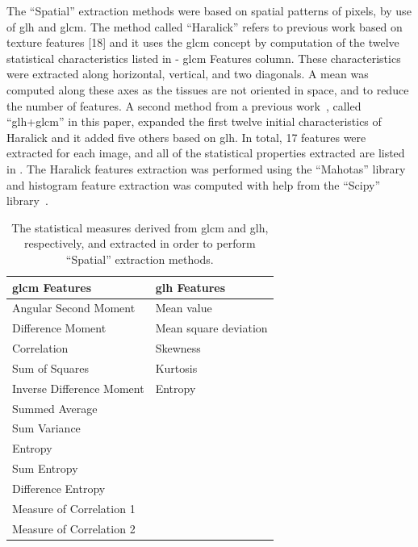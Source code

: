 \documentclass[journal,article,submit,moreauthors,pdftex, applsci]{Definitions/mdpi}
\begin{document}
The “Spatial” extraction methods were based on spatial patterns of pixels, by use of \ac{glh} and \ac{glcm}. The method called “Haralick” refers to previous work based on texture features [18] and it uses the \ac{glcm} concept by computation of the twelve statistical characteristics listed in  - \ac{glcm} Features column. These characteristics were extracted along horizontal, vertical, and two diagonals. A mean was computed along these axes as the tissues are not oriented in space, and to reduce the number of features. A second method from a previous work~\cite{Wiltgen2008}, called “\ac{glh}+\ac{glcm}” in this paper, expanded the first twelve initial characteristics of Haralick and it added five others based on \ac{glh}. In total, 17 features were extracted for each image, and all of the statistical properties extracted are listed in . The Haralick features extraction was performed using the “Mahotas” library~\cite{coelho2012mahotas} and histogram feature extraction was computed with help from the “Scipy” library~\cite{Jones2001}.\par
\begin{table}[h]
    \centering
    \begin{tabular}{ll}
        \hline
        \textbf{\ac{glcm} Features}& \textbf{\ac{glh} Features}     \\ \hline
        Angular Second Moment      & Mean value                     \\
        Difference Moment          & Mean square deviation          \\
        Correlation                & Skewness                       \\
        Sum of Squares             & Kurtosis                       \\
        Inverse Difference Moment  & Entropy                        \\     
        Summed Average             &                                \\    
        Sum Variance               &                                \\    
        Entropy                    &                                \\    
        Sum Entropy                &                                \\    
        Difference Entropy         &                                \\    
        Measure of Correlation 1   &                                \\  
        Measure of Correlation 2   &                                \\ 
    \end{tabular}
    \caption{The statistical measures derived from \ac{glcm} and \ac{glh}, respectively, and extracted in order to perform “Spatial” extraction methods.}
    \label{tab:histogram_features}
\end{table}\par
\end{document}
